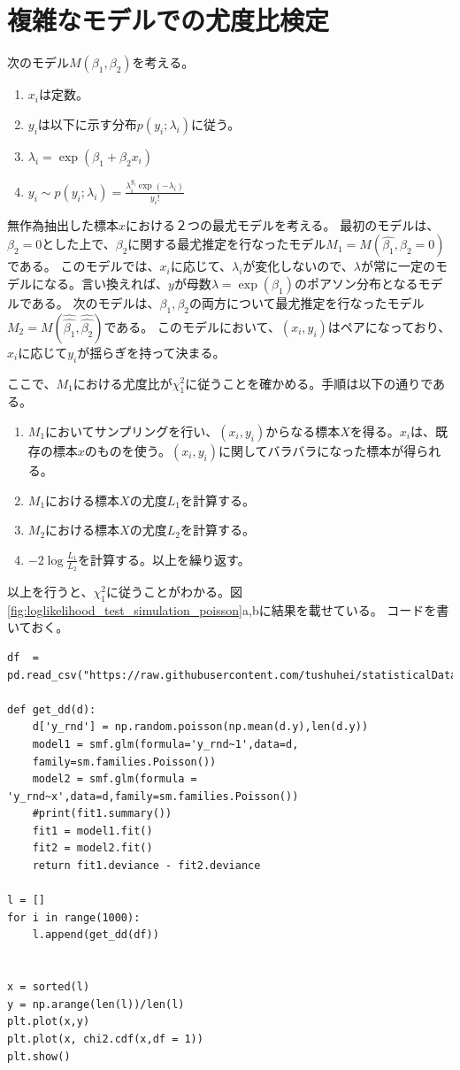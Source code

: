 \section{複雑なモデルでの尤度比検定}
次のモデル$M(\beta_1,\beta_2)$を考える。
\begin{enumerate}
    \item $x_i$は定数。
    \item $y_i$は以下に示す分布$p(y_i;\lambda_i)$に従う。
    \item $\lambda_i = \exp(\beta_1+\beta_2 x_i)$
    \item $y_i \sim p(y_i;\lambda_i) = \frac{\lambda_i^{y_i}\exp(-\lambda_i)}{y_i!}$
\end{enumerate}
無作為抽出した標本$x$における２つの最尤モデルを考える。
最初のモデルは、$\beta_2=0$とした上で、$\beta_2$に関する最尤推定を行なったモデル$M_1=M(\hat{\beta_1},\beta_2=0)$である。
このモデルでは、$x_i$に応じて、$\lambda_i$が変化しないので、$\lambda$が常に一定のモデルになる。言い換えれば、$y$が母数$\lambda=\exp(\beta_1)$のポアソン分布となるモデルである。
次のモデルは、$\beta_1,\beta_2$の両方について最尤推定を行なったモデル$M_2=M(\hat{\hat{\beta_1}},\hat{\hat{\beta_2}})$である。
このモデルにおいて、$(x_i,y_i)$はペアになっており、$x_i$に応じて$y_i$が揺らぎを持って決まる。

ここで、$M_1$における尤度比が$\chi_1^2$に従うことを確かめる。手順は以下の通りである。
\begin{enumerate}
    \item $M_1$においてサンプリングを行い、$(x_i,y_i)$からなる標本$X$を得る。$x_i$は、既存の標本$x$のものを使う。$(x_i,y_i)$に関してバラバラになった標本が得られる。
    \item $M_1$における標本$X$の尤度$L_1$を計算する。
    \item $M_2$における標本$X$の尤度$L_2$を計算する。
    \item $-2\log\frac{L_1}{L_2}$を計算する。以上を繰り返す。
\end{enumerate}
以上を行うと、$\chi^2_1$に従うことがわかる。図\ref{fig:loglikelihood_test_simulation_poisson}a,bに結果を載せている。
コードを書いておく。
\begin{lstlisting}
df  = pd.read_csv("https://raw.githubusercontent.com/tushuhei/statisticalDataModeling/master/data3a.csv")

def get_dd(d):
    d['y_rnd'] = np.random.poisson(np.mean(d.y),len(d.y))
    model1 = smf.glm(formula='y_rnd~1',data=d,
    family=sm.families.Poisson())
    model2 = smf.glm(formula = 'y_rnd~x',data=d,family=sm.families.Poisson())
    #print(fit1.summary())
    fit1 = model1.fit()
    fit2 = model2.fit()
    return fit1.deviance - fit2.deviance

l = []
for i in range(1000):
    l.append(get_dd(df))


x = sorted(l)
y = np.arange(len(l))/len(l)
plt.plot(x,y)
plt.plot(x, chi2.cdf(x,df = 1))
plt.show()
\end{lstlisting}


